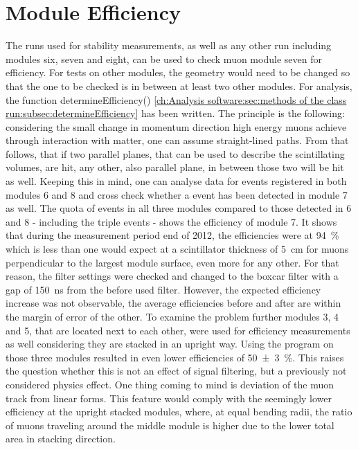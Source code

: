   \section{Module Efficiency}
  \label{ch:Analysis:sec:Module Efficiency}
  The runs used for stability measurements, as well as any other run including modules six, seven and eight, can be used to check muon module seven for efficiency. For tests on other modules, the geometry would need to be changed so that the one to be checked is in between at least two other modules.
  For analysis, the function determineEfficiency() \ref{ch:Analysis software:sec:methods of the class run:subsec:determineEfficiency}
  has been written.
  The principle is the following: considering the small change in momentum direction high energy muons achieve through interaction with matter, one can assume straight-lined paths. From that follows, that if two parallel planes, that can be used to describe the scintillating volumes, are hit, any other, also parallel plane, in between those two will be hit as well. Keeping this in mind, one can analyse data for events registered in both modules 6 and 8 and cross check whether a event has been detected in module 7 as well. The quota of events in all three modules compared to those detected in 6 and 8 -  including the triple events - shows the efficiency of module 7.
  It shows that during the measurement period end of 2012, the efficiencies were at  \SI{94 }{\percent} which is less than one would expect at a scintillator thickness of \SI{5}{\centi\meter} for muons perpendicular to the largest module surface, even more for any other.
  For that reason, the filter settings were checked and changed to the boxcar filter with a gap of \SI{150}{\ns} from the before used  filter. However, the expected efficiency increase was not observable, the average efficiencies before and after are within the margin of error of the other.
  To examine the problem further modules 3, 4 and 5, that are located next to each other, were used for efficiency measurements as well considering they are stacked in an upright way. Using the program on those three modules resulted in even lower efficiencies of \SI{50(3)}{\percent}. This raises the question whether this is not an effect of signal filtering, but a previously not considered physics effect. One thing coming to mind is deviation of the muon track from linear forms. This feature would comply with the seemingly lower efficiency at the upright stacked modules, where, at equal bending radii, the ratio of muons traveling around the middle module is higher due to the lower total area in stacking direction.
